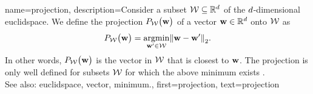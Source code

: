  {name={projection}, 
       description={Consider a subset $\mathcal{W} \subseteq \mathbb{R}^{d}$ of 
	   the $d$-dimensional \gls{euclidspace}. We define the projection $P_{\mathcal{W}}\big( {\bf w}\big)$
	   of a \gls{vector} ${\bf w} \in \mathbb{R}^{d}$ onto $\mathcal{W}$ as
	   \begin{equation} 
   	   	\nonumber
		\label{equ_def_proj_generic_dict}
  	    	\projection{\paramspace}{\weights} = \argmin_{\weights' \in \paramspace} \normgeneric{\weights - \weights'}{2}. 
        	    \end{equation}
	    In other words, $P_{\mathcal{W}}\big( {\bf w}\big)$ is the \gls{vector} in $\mathcal{W}$ 
	    that is closest to ${\bf w}$. The projection is only well defined for subsets $\mathcal{W}$ 
	    for which the above \gls{minimum} exists \cite{BoydConvexBook}.
		 			\\ 
	    See also: \gls{euclidspace}, \gls{vector}, \gls{minimum}.},
	first={projection},
	text={projection}
}


